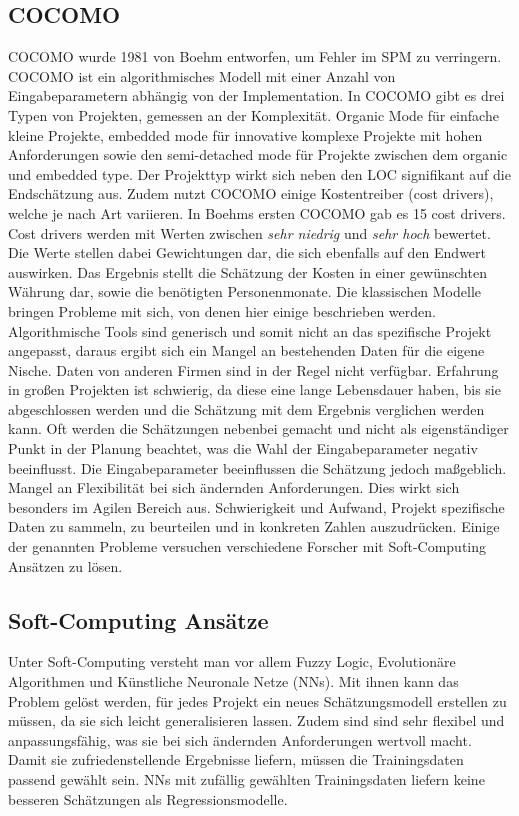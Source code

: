\subsection{COCOMO}
 COCOMO wurde 1981 von Boehm entworfen, um Fehler im SPM zu verringern. COCOMO ist ein algorithmisches Modell mit einer Anzahl von Eingabeparametern abhängig von der Implementation. In COCOMO gibt es drei Typen von Projekten, gemessen an der Komplexität. Organic Mode für einfache kleine Projekte, embedded mode für innovative komplexe Projekte mit hohen Anforderungen sowie den semi-detached mode für Projekte zwischen dem organic und embedded type. Der Projekttyp wirkt sich neben den LOC signifikant auf die Endschätzung aus. Zudem nutzt COCOMO einige Kostentreiber (cost drivers), welche je nach Art variieren. In Boehms ersten COCOMO gab es 15 cost drivers. Cost drivers werden mit Werten zwischen \textit{sehr niedrig} und \textit{sehr hoch} bewertet. Die Werte stellen dabei Gewichtungen dar, die sich ebenfalls auf den Endwert auswirken. Das Ergebnis stellt die Schätzung der Kosten in einer gewünschten Währung dar, sowie die benötigten Personenmonate. Die klassischen Modelle bringen Probleme mit sich, von denen hier einige beschrieben werden.
 \\
Algorithmische Tools sind generisch und somit nicht an das spezifische Projekt angepasst, daraus ergibt sich ein Mangel an bestehenden Daten für die eigene Nische. Daten von anderen Firmen sind in der Regel nicht verfügbar. Erfahrung in großen Projekten ist schwierig, da diese eine lange Lebensdauer haben, bis sie abgeschlossen werden und die Schätzung mit dem Ergebnis verglichen werden kann. Oft werden die Schätzungen nebenbei gemacht und nicht als eigenständiger Punkt in der Planung beachtet, was die Wahl der Eingabeparameter negativ beeinflusst. Die Eingabeparameter beeinflussen die Schätzung jedoch maßgeblich. Mangel an Flexibilität bei sich ändernden Anforderungen. Dies wirkt sich besonders im Agilen Bereich aus. Schwierigkeit und Aufwand, Projekt spezifische Daten zu sammeln, zu beurteilen und in konkreten Zahlen auszudrücken. Einige der genannten Probleme versuchen verschiedene Forscher mit Soft-Computing Ansätzen zu lösen\cite{Bilgaiyan2016}\cite{Chen2005}\cite{Heemstra1992}\cite{Abrahamsson2007}.

\subsection{Soft-Computing Ansätze}
Unter Soft-Computing versteht man vor allem Fuzzy Logic, Evolutionäre Algorithmen und Künstliche Neuronale Netze (NNs). Mit ihnen kann das Problem gelöst werden, für jedes Projekt ein neues Schätzungsmodell erstellen zu müssen, da sie sich leicht generalisieren lassen. Zudem sind sind sehr flexibel und anpassungsfähig, was sie bei sich ändernden Anforderungen wertvoll macht.\cite{Boetticher2001} Damit sie zufriedenstellende Ergebnisse liefern, müssen die Trainingsdaten passend gewählt sein. NNs mit zufällig gewählten Trainingsdaten liefern keine besseren Schätzungen als Regressionsmodelle. \cite{Setyawati2002}

